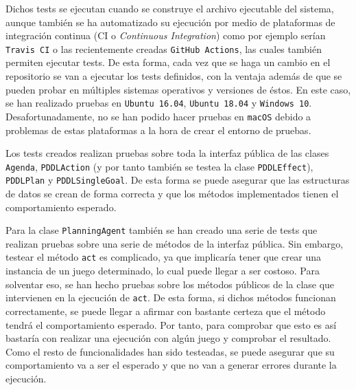 Dichos tests se ejecutan cuando se construye el archivo ejecutable del sistema, aunque también se
ha automatizado su ejecución por medio de plataformas de integración continua
(CI o \textit{Continuous Integration}) como por ejemplo serían \texttt{Travis CI} o las
recientemente creadas \texttt{GitHub Actions}, las cuales también permiten ejecutar tests.
De esta forma, cada vez que se haga un cambio en el repositorio se van a ejecutar los tests definidos,
con la ventaja además de que se pueden probar en múltiples sistemas operativos y versiones de éstos.
En este caso, se han realizado pruebas en \texttt{Ubuntu 16.04}, \texttt{Ubuntu 18.04}
y \texttt{Windows 10}. Desafortunadamente, no se han podido hacer pruebas en \texttt{macOS}
debido a problemas de estas plataformas a la hora de crear el entorno de pruebas.

Los tests creados realizan pruebas sobre toda la interfaz pública de las clases \texttt{Agenda},
\texttt{PDDLAction} (y por tanto también se testea la clase \texttt{PDDLEffect}), \texttt{PDDLPlan} y
\texttt{PDDLSingleGoal}. De esta forma se puede asegurar que las estructuras de datos se crean
de forma correcta y que los métodos implementados tienen el comportamiento esperado.

Para la clase \texttt{PlanningAgent} también se han creado una serie de tests que realizan
pruebas sobre una serie de métodos de la interfaz pública. Sin embargo, testear el método
\texttt{act} es complicado, ya que implicaría tener que crear una instancia de un juego
determinado, lo cual puede llegar a ser costoso. Para solventar eso, se han hecho pruebas
sobre los métodos públicos de la clase que intervienen en la ejecución de \texttt{act}. De esta
forma, si dichos métodos funcionan correctamente, se puede llegar a afirmar con bastante certeza
que el método tendrá el comportamiento esperado. Por tanto, para comprobar que esto es así bastaría
con realizar una ejecución con algún juego y comprobar el resultado. Como el resto de funcionalidades
han sido testeadas, se puede asegurar que su comportamiento va a ser el esperado y que no van a generar
errores durante la ejecución.
